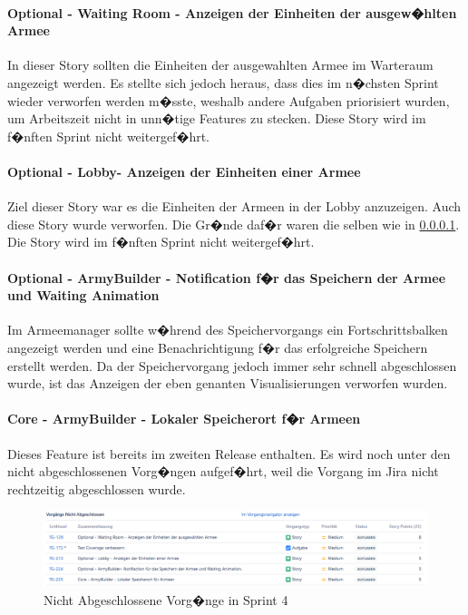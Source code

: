 \documentclass[12pt, titlepage]{scrartcl}
\begin{document}
				\paragraph{Optional - Waiting Room - Anzeigen der Einheiten der ausgew�hlten Armee}
				\label{OWaitingRoomAnzeigenEinheiten}
				In dieser Story sollten die Einheiten der ausgewahlten Armee im Warteraum angezeigt werden. Es stellte sich jedoch heraus, dass dies im n�chsten Sprint wieder verworfen werden m�sste, weshalb andere Aufgaben priorisiert wurden, um Arbeitszeit nicht in unn�tige Features zu stecken. Diese Story wird im f�nften Sprint nicht weitergef�hrt.
				
				\paragraph{Optional - Lobby- Anzeigen der Einheiten einer Armee}
				Ziel dieser Story war es die Einheiten der Armeen in der Lobby anzuzeigen. Auch diese Story wurde verworfen. Die Gr�nde daf�r waren die selben wie in \ref{OWaitingRoomAnzeigenEinheiten}. Die Story wird im f�nften Sprint nicht weitergef�hrt.
				
				\paragraph{Optional - ArmyBuilder - Notification f�r das Speichern der Armee und Waiting Animation}
				Im Armeemanager sollte w�hrend des Speichervorgangs ein Fortschrittsbalken angezeigt werden und eine Benachrichtigung f�r das erfolgreiche Speichern erstellt werden. Da der Speichervorgang jedoch immer sehr schnell abgeschlossen wurde, ist das Anzeigen der eben genanten Visualisierungen verworfen wurden.
				
				\paragraph{Core - ArmyBuilder - Lokaler Speicherort f�r Armeen}
				Dieses Feature ist bereits im zweiten Release enthalten. Es wird noch unter den nicht abgeschlossenen Vorg�ngen aufgef�hrt, weil die Vorgang im Jira nicht rechtzeitig abgeschlossen wurde.
			
				
			\begin{figure}[H] 
				\centering
				\includegraphics[width=1\textwidth]{Nicht_Abgeschlossene_Vorgaenge_Sprint_4.PNG}
				\caption{Nicht Abgeschlossene Vorg�nge in Sprint 4}
				\label{NichtAbgeschlosseneVorgaengeSprint4}
			\end{figure}
		
\end{document}

